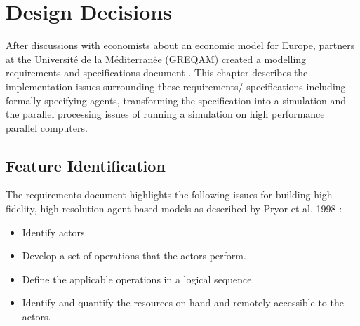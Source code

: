 \documentclass[a4paper,11pt]{article}
\begin{document}
\pagebreak

\section{Design Decisions}

After discussions with economists about an economic model for
Europe, partners at the Universit\'{e} de la M\'{e}diterran\'{e}e
(GREQAM) created a modelling requirements and specifications
document \cite{EURACEModellingRequirements:2007,EURACEModellingSpecifications:2007}. This chapter describes the
implementation issues surrounding these requirements/ specifications
including formally specifying agents, transforming the specification
into a simulation and the parallel processing issues of running a
simulation on high performance parallel computers.

\subsection{Feature Identification}

The requirements document highlights the following issues for
building high-fidelity, high-resolution agent-based models as
described by Pryor et al. 1998 \cite{SANDIA:1998}:
\begin{itemize}
\item Identify actors.
\item Develop a set of operations that the actors perform.
\item Define the applicable operations in a logical sequence.
\item Identify and quantify the resources on-hand and remotely accessible to the
actors.
\end{itemize}
\end{document}
